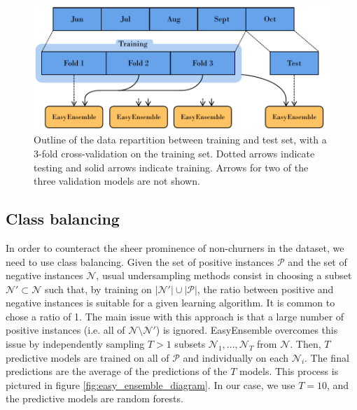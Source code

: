 \begin{figure}
    \centering
	\includegraphics[width=0.9\linewidth]{figures/experiment_diagram.pdf}
	\caption{Outline of the data repartition between training and test set, with
	a 3-fold cross-validation on the training set. Dotted arrows indicate
	testing and solid arrows indicate training. Arrows for two of the three
	validation models are not shown.}
	\label{fig:experiment_diagram}
\end{figure}

\subsection{Class balancing}

In order to counteract the sheer prominence of non-churners in the dataset, we
need to use class balancing. Given the set of positive instances $\mathcal P$
and the set of negative instances $\mathcal N$, usual undersampling methods
consist in choosing a subset $\mathcal N'\subset \mathcal N$ such that, by
training on $|\mathcal N'|\cup|\mathcal P|$, the ratio between positive and
negative instances is suitable for a given learning algorithm. It is common to
chose a ratio of 1. The main issue with this approach is that a large number of
positive instances (i.e. all of $\mathcal N \setminus \mathcal N'$) is ignored.
EasyEnsemble \parencite{liu2009exploratory} overcomes this issue by
independently sampling $T>1$ subsets $\mathcal N_1,\dots,\mathcal N_T$ from
$\mathcal N$. Then, $T$ predictive models are trained on all of $\mathcal P$ and
individually on each $\mathcal N_i$. The final predictions are the average of
the predictions of the $T$ models. This process is pictured in figure
\ref{fig:easy_ensemble_diagram}. In our case, we use $T=10$, and the predictive
models are random forests.


